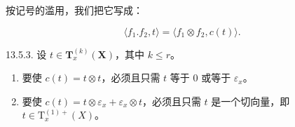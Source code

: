 按记号的滥用，我们把它写成：

\[
\langle f _ {1}. f _ {2}, t \rangle = \langle f _ {1} \otimes f _ {2}, c (t) \rangle .
\]

13.5.3. 设 \(t \in \mathbf{T}_x^{(k)}(\mathbf{X})\)，其中 \(k \leqslant r\)。

\begin{enumerate}
\def\labelenumi{\alph{enumi})}
\item
  要使 \(c(t)=t\otimes t\)，必须且只需 \(t\) 等于 0 或等于 \(\varepsilon_{x}\)。
\item
  要使 \(c(t)=t\otimes\varepsilon_{x}+\varepsilon_{x}\otimes t\)，必须且只需 \(t\) 是一个切向量，即 \(t\in\mathrm{T}_{x}^{(1)+}(X)\)。
\end{enumerate}

